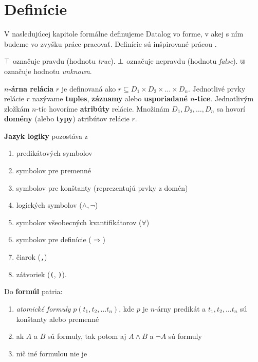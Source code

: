\newcommand{\inter}{\mathcal{I}}

\section{Definície}
V nasledujúcej kapitole formálne definujeme Datalog vo forme, v akej s ním budeme vo zvyšku práce
pracovať. Definície sú inšpirované prácou \cite{hedera2022relacna}.

\begin{note}
$\top$ označuje pravdu (hodnotu \textit{true}). $\bot$ označuje nepravdu (hodnotu
\textit{false}). $\Cup$ označuje hodnotu \textit{unknown}.
\end{note}

\begin{definition}
\textbf{$n$-árna relácia} $r$ je definovaná ako $r \subseteq D_1 \times D_2 \times \dots \times
D_n$. Jednotlivé prvky relácie $r$ nazývame \textbf{tuples}, \textbf{záznamy} alebo
\textbf{usporiadané $n$-tice}. Jednotlivým zložkám $n$-tíc hovoríme \textbf{atribúty} relácie.
Množinám $D_1, D_2, \dots, D_n$ sa hovorí \textbf{domény} (alebo \textbf{typy}) atribútov relácie
$r$. 
\end{definition}

\begin{samepage}
    \begin{definition}
        \label{znaky_jazyka_1}
\textbf{Jazyk logiky} pozostáva z
        \begin{enumerate}[topsep=0pt,itemsep=-1ex,partopsep=1ex,parsep=1ex]
\item predikátových symbolov
\item symbolov pre premenné
\item symbolov pre konštanty (reprezentujú prvky z domén)
\item logických symbolov ($\land, \lnot$)
\item symbolov všeobecných kvantifikátorov ($\forall$)
\item symbolov pre definície ($\Rightarrow$)
\item čiarok (\texttt{,})
\item zátvoriek (\texttt{(}, \texttt{)}).
        \end{enumerate}
    \end{definition}
\end{samepage}

\begin{samepage}
    \begin{definition}
        \label{doplnanie}
Do \textbf{formúl} patria:
        \begin{enumerate}[topsep=0pt,itemsep=-1ex,partopsep=1ex,parsep=1ex]
\item \textit{atomické formuly} $p(t_1, t_2, \dots t_n)$, kde $p$ je $n$-árny predikát a $t_1, t_2,
\dots t_n$ sú konštanty alebo premenné
\item ak $A$ a $B$ sú formuly, tak potom aj $A \land B$ a $\lnot A$ sú formuly
\item nič iné formulou nie je
        \end{enumerate}
    \end{definition}
\end{samepage}

